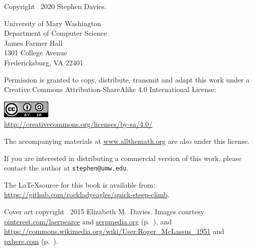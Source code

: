 
\thispagestyle{empty}

Copyright \textcopyright \ 2020 Stephen Davies.

\bigskip

University of Mary Washington\\
Department of Computer Science\\
James Farmer Hall\\
1301 College Avenue\\
Fredericksburg, VA  22401

\vspace{.4in}

Permission is granted to copy, distribute, transmit and adapt this work under a
Creative Commons Attribution-ShareAlike 4.0 International License:

\begin{center}
\includegraphics{cc_license.png}\\
\smallskip
\url{http://creativecommons.org/licenses/by-sa/4.0/}
\end{center}

The accompanying materials at \url{www.allthemath.org} are also under this
license.

\vspace{.2in}
If you are interested in distributing a commercial version of this work, please
contact the author at \texttt{stephen@umw.edu}.

\vspace{.4in}
The \LaTeX source for this book is available from:
\url{https://github.com/rockladyeagles/quick-steep-climb}.


\vspace{1.4in}
Cover art copyright \textcopyright \ 2015 Elizabeth M.~Davies.
Images courtesy \url{pinterest.com/laerpearce} and \url{serpmedia.org}
(p.~\pageref{tacoma}), and
\url{https://commons.wikimedia.org/wiki/User:Roger\_McLassus\_1951} and
\url{pxhere.com} (p.~\pageref{slinky}).
